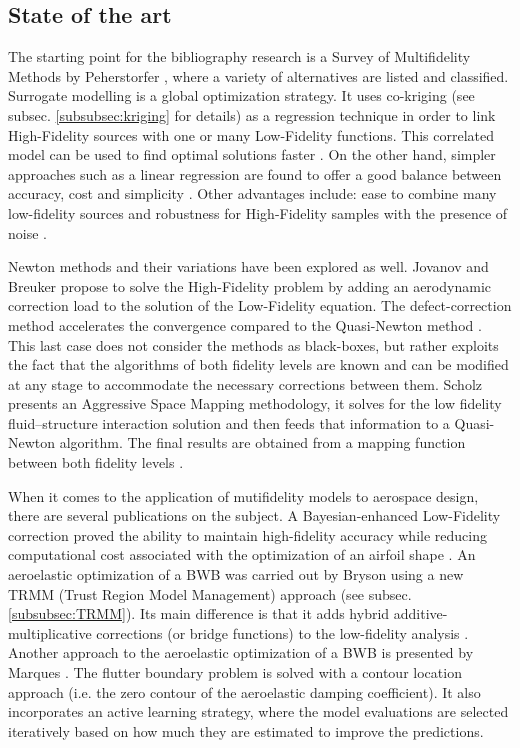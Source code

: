 \subsection{State of the art}
\label{subsec:sota}
The starting point for the bibliography research is a Survey of Multifidelity Methods by Peherstorfer \cite{peherstorfer2018survey}, where a variety of alternatives are listed and classified. Surrogate modelling is a global optimization strategy. It uses co-kriging (see subsec. \ref{subsubsec:kriging} for details) as a regression technique in order to link High-Fidelity sources with one or many Low-Fidelity functions. This correlated model can be used to find optimal solutions faster \cite{Forrester2007}. On the other hand, simpler approaches such as a linear regression are found to offer a good balance between accuracy, cost and simplicity \cite{Zhang2019}. Other advantages include: ease to combine many low-fidelity sources and robustness for High-Fidelity samples with the presence of noise \cite{Zhang2019}. \par 
Newton methods and their variations have been explored as well. Jovanov and Breuker propose to solve the High-Fidelity problem by adding an aerodynamic correction load to the solution of the Low-Fidelity equation. The defect-correction method accelerates the convergence compared to the Quasi-Newton method \cite{Jovanov2015}. This last case does not consider the methods as black-boxes, but rather exploits the fact that the algorithms of both fidelity levels are known and can be modified at any stage to accommodate the necessary corrections between them. Scholz presents an Aggressive Space Mapping methodology, it solves for the low fidelity fluid–structure interaction solution and then feeds that information to a Quasi-Newton algorithm. The final results are obtained from a mapping function between both fidelity levels \cite{Scholcz2014}. \par
When it comes to the application of mutifidelity models to aerospace design, there are several publications on the subject. A Bayesian-enhanced Low-Fidelity correction proved the ability to maintain high-fidelity accuracy while reducing computational cost associated with the optimization of an airfoil shape \cite{fischer2018bayesian}. An aeroelastic optimization of a BWB was carried out by Bryson \cite{Bryson2019} using a new TRMM (Trust Region Model Management) approach (see subsec. \ref{subsubsec:TRMM}). Its main difference is that it adds hybrid additive-multiplicative corrections (or bridge functions) to the low-fidelity analysis \cite{Bryson2019a}. Another approach to the aeroelastic optimization of a BWB is presented by Marques \cite{Marques2019}. The flutter boundary problem is solved with a contour location approach (i.e. the zero contour of the aeroelastic damping coefficient). It also incorporates an active learning strategy, where the model evaluations are selected iteratively based on how much they are estimated to improve the predictions.

